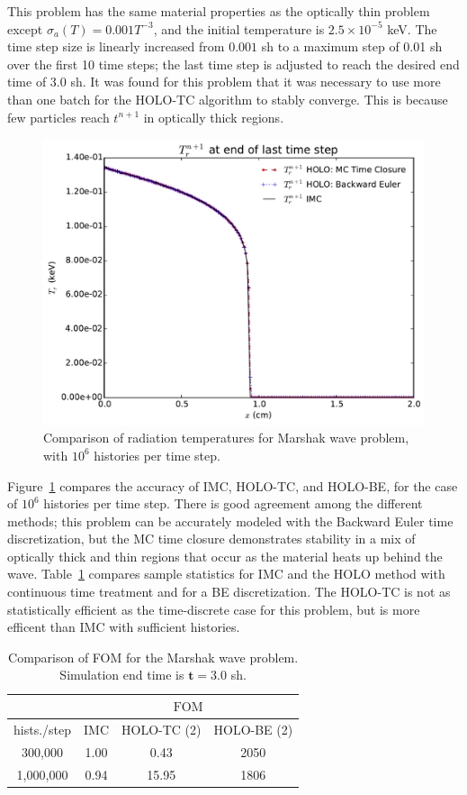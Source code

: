 \documentclass{anstrans}
\newcommand{\FOM}{\ensuremath{\text{FOM}}}
\begin{document}
This problem has the same material properties as the optically thin problem except
$\sigma_a(T) = 0.001 T^{-3}$, and the initial temperature is $2.5\times10^{-5}$ keV.  The time step size is linearly increased from $0.001$ sh to a
maximum step of 0.01 sh over the first 10 time steps; the last time step is adjusted to
reach the desired end time of $3.0$ sh.  It was found for this problem that it was
necessary to use more than one batch for the HOLO-TC algorithm to stably converge.
This is because few particles reach $t^{n+1}$ in optically
thick regions.
\begin{figure}
    \centering
    \includegraphics[width=0.92\linewidth]{marshak_time_cont_compare.pdf}
    \caption{\label{fig:marshak_tc} Comparison of radiation temperatures for Marshak wave problem, with $10^6$ histories per time step.}
\end{figure}

Figure~\ref{fig:marshak_tc} compares the accuracy of IMC, HOLO-TC, and HOLO-BE, for the case of $10^6$ histories per time step.
There is good agreement among the different methods; this problem can be accurately modeled with the Backward Euler time discretization, but
the MC time closure demonstrates stability in a mix of optically thick and thin
regions that occur as the material heats up behind the wave. Table~\ref{tab:marshak_cont} compares sample statistics for IMC and
the HOLO method with continuous time treatment and for a BE discretization. The HOLO-TC is not as statistically efficient as the time-discrete case for this problem, but is more efficent than IMC with sufficient histories.  
\begin{table}[H]
\centering
\caption{\label{tab:marshak_cont} {Comparison of FOM for the Marshak
    wave problem.  Simulation end time is $\mathbf{t=3.0}$ sh.}}
\begin{tabular}{|c|ccc|}\cline{2-4}
    \multicolumn{1}{c|}{}        &
    \multicolumn{3}{|c|}{\FOM} \\ \hline
hists./step    &  IMC   & HOLO-TC (2) & HOLO-BE (2) \\ \hline
  300,000      &  1.00  &   0.43    & 2050          \\  
  1,000,000    &  0.94  &  15.95    & 1806          \\ \hline
\end{tabular}
\end{table}
\end{document}
